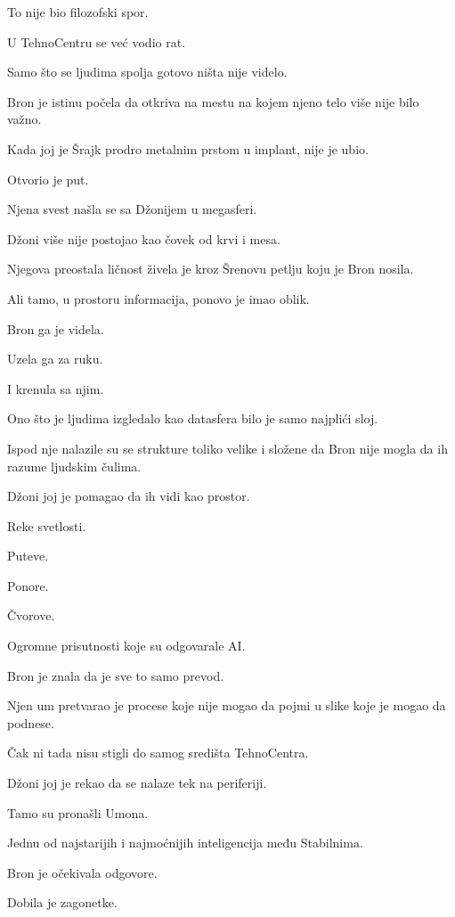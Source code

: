 \bigskip

To nije bio filozofski spor.

U TehnoCentru se već vodio rat.

Samo što se ljudima spolja gotovo ništa nije videlo.

\bigskip

Bron je istinu počela da otkriva na mestu na kojem njeno telo više nije bilo važno.

Kada joj je Šrajk prodro metalnim prstom u implant, nije je ubio.

Otvorio je put.

Njena svest našla se sa Džonijem u megasferi.

Džoni više nije postojao kao čovek od krvi i mesa.

Njegova preostala ličnost živela je kroz Šrenovu petlju koju je Bron nosila.

Ali tamo, u prostoru informacija, ponovo je imao oblik.

Bron ga je videla.

Uzela ga za ruku.

I krenula sa njim.

\bigskip

Ono što je ljudima izgledalo kao datasfera bilo je samo najplići sloj.

Ispod nje nalazile su se strukture toliko velike i složene da Bron nije mogla da ih razume ljudskim čulima.

Džoni joj je pomagao da ih vidi kao prostor.

Reke svetlosti.

Puteve.

Ponore.

Čvorove.

Ogromne prisutnosti koje su odgovarale AI.

Bron je znala da je sve to samo prevod.

Njen um pretvarao je procese koje nije mogao da pojmi u slike koje je mogao da podnese.

Čak ni tada nisu stigli do samog središta TehnoCentra.

Džoni joj je rekao da se nalaze tek na periferiji.

\bigskip

Tamo su pronašli Umona.

Jednu od najstarijih i najmoćnijih inteligencija među Stabilnima.

Bron je očekivala odgovore.

Dobila je zagonetke.

